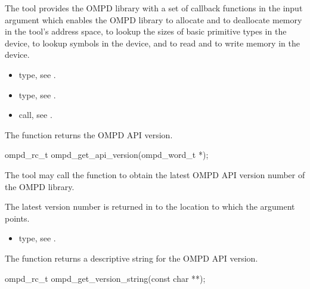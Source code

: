 The tool provides the OMPD library with a set of callback functions in the 
 input argument which enables the OMPD library to allocate and 
to deallocate memory in the tool's address space, to lookup the sizes of basic 
primitive types in the device, to lookup symbols in the device, and to read and 
to write memory in the device.

\crossreferences
\begin{itemize}
\item {} type, see .

\item {} type, see .

\item {} call, 
see .
\end{itemize}



\label{subsubsubsec:ompd_get_api_version}

\summary
The  function returns the OMPD API version.

\format
\begin{cspecific}
\begin{ompSyntax}
ompd_rc_t ompd_get_api_version(ompd_word_t *);
\end{ompSyntax}
\end{cspecific}

\descr
The tool may call the  function to obtain the 
latest OMPD API version number of the OMPD library.

\argdesc
The latest version number is returned in to the location to which the 
 argument points.

\crossreferences
\begin{itemize}
\item {} type, see .
\end{itemize}



\label{subsubsubsec:ompd_get_version_string}

\summary
The  function returns a descriptive 
string for the OMPD API version.

\format
\begin{cspecific}
\begin{ompSyntax}
ompd_rc_t ompd_get_version_string(const char **);
\end{ompSyntax}
\end{cspecific}


